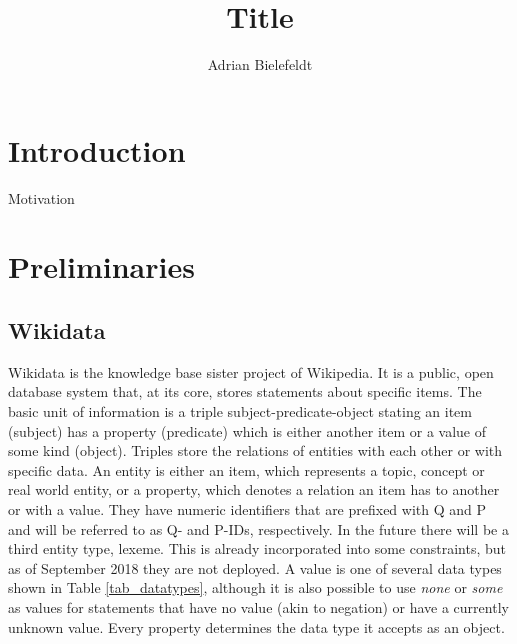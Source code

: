 \documentclass[hyperref,bachelorofscience,fleqn]{cgvpub}
\author{Adrian Bielefeldt}
\title{Title}
\begin{document}
\chapter{Introduction}
Motivation

\chapter{Preliminaries}
\section{Wikidata}
Wikidata is the knowledge base sister project of Wikipedia. It is a public, open database system that, at its core, stores statements about specific items. The basic unit of information is a triple subject-predicate-object stating an item (subject) has a property (predicate) which is either another item or a value of some kind (object). Triples store the relations of entities with each other or with specific data. An entity is either an item, which represents a topic, concept or real world entity, or a property, which denotes a relation an item has to another or with a value. They have numeric identifiers that are prefixed with Q and P and will be referred to as Q- and P-IDs, respectively. In the future there will be a third entity type, lexeme. This is already incorporated into some constraints, but as of September 2018 they are not deployed. A value is one of several data types shown in Table \ref{tab_datatypes}, although it is also possible to use \emph{none} or \emph{some} as values for statements that have no value (akin to negation) or have a currently unknown value. Every property determines the data type it accepts as an object. \\
\end{document}
